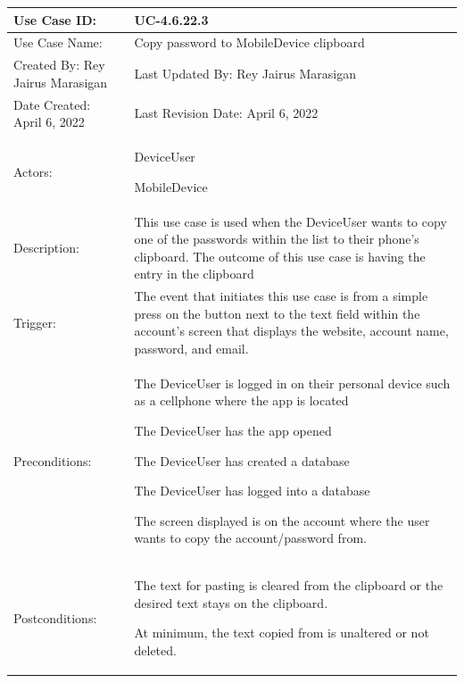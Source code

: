 \documentclass[stu]{apa7}
\newcommand{\nextitem}{\par\hspace*{\labelsep}\textbullet\hspace*{\labelsep}}
\begin{document}
\scriptsize{\begin{xltabular}{\textwidth}{|l|X|}
              \hline Use Case ID: & UC-4.6.22.3 \\ \hline

              Use Case Name:  & Copy password to MobileDevice clipboard \\ \hline

              Created By: Rey Jairus Marasigan & Last Updated By: Rey Jairus Marasigan \\ \hline

              Date Created: April 6, 2022 & Last Revision Date: April 6, 2022 \\ \hline

              Actors: & \nextitem DeviceUser \nextitem MobileDevice \\ \hline

              Description: & This use case is used when the DeviceUser wants to copy one of the passwords within the list to their phone’s clipboard. The outcome of this use case is having the entry in the clipboard \\ \hline

              Trigger: & The event that initiates this use case is from a simple press on the button next to the text field within the account’s screen that displays the website, account name, password, and email. \\ \hline

             Preconditions: & \nextitem The DeviceUser is logged in on their personal device such as a cellphone where the app is located
                              \nextitem The DeviceUser has the app opened
                              \nextitem The DeviceUser has created a database
                              \nextitem The DeviceUser has logged into a database
                              \nextitem The screen displayed is on the account where the user wants to copy the account/password from. \\ \hline

              Postconditions: & \nextitem The text for pasting is cleared from the clipboard or the desired text stays on the clipboard.
                                \nextitem At minimum, the text copied from is unaltered or not deleted. \\ \hline


\end{xltabular}}
\end{document}
